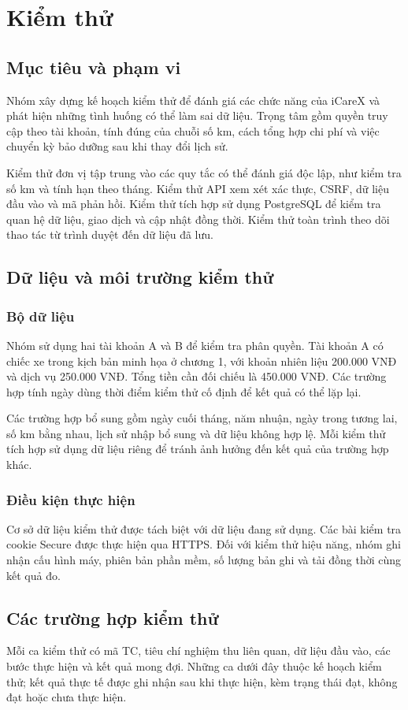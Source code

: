 \chapter{Kiểm thử}\label{chap:testing}
\section{Mục tiêu và phạm vi}
Nhóm xây dựng kế hoạch kiểm thử để đánh giá các chức năng của iCareX và phát hiện những tình huống có thể làm sai dữ liệu. Trọng tâm gồm quyền truy cập theo tài khoản, tính đúng của chuỗi số km, cách tổng hợp chi phí và việc chuyển kỳ bảo dưỡng sau khi thay đổi lịch sử.

Kiểm thử đơn vị tập trung vào các quy tắc có thể đánh giá độc lập, như kiểm tra số km và tính hạn theo tháng. Kiểm thử API xem xét xác thực, CSRF, dữ liệu đầu vào và mã phản hồi. Kiểm thử tích hợp sử dụng PostgreSQL để kiểm tra quan hệ dữ liệu, giao dịch và cập nhật đồng thời. Kiểm thử toàn trình theo dõi thao tác từ trình duyệt đến dữ liệu đã lưu.

\section{Dữ liệu và môi trường kiểm thử}
\subsection{Bộ dữ liệu}
Nhóm sử dụng hai tài khoản A và B để kiểm tra phân quyền. Tài khoản A có chiếc xe trong kịch bản minh họa ở chương 1, với khoản nhiên liệu 200.000 VNĐ và dịch vụ 250.000 VNĐ. Tổng tiền cần đối chiếu là 450.000 VNĐ. Các trường hợp tính ngày dùng thời điểm kiểm thử cố định để kết quả có thể lặp lại.

Các trường hợp bổ sung gồm ngày cuối tháng, năm nhuận, ngày trong tương lai, số km bằng nhau, lịch sử nhập bổ sung và dữ liệu không hợp lệ. Mỗi kiểm thử tích hợp sử dụng dữ liệu riêng để tránh ảnh hưởng đến kết quả của trường hợp khác.

\subsection{Điều kiện thực hiện}
Cơ sở dữ liệu kiểm thử được tách biệt với dữ liệu đang sử dụng. Các bài kiểm tra cookie Secure được thực hiện qua HTTPS. Đối với kiểm thử hiệu năng, nhóm ghi nhận cấu hình máy, phiên bản phần mềm, số lượng bản ghi và tải đồng thời cùng kết quả đo.

\section{Các trường hợp kiểm thử}
Mỗi ca kiểm thử có mã TC, tiêu chí nghiệm thu liên quan, dữ liệu đầu vào, các bước thực hiện và kết quả mong đợi. Những ca dưới đây thuộc kế hoạch kiểm thử; kết quả thực tế được ghi nhận sau khi thực hiện, kèm trạng thái đạt, không đạt hoặc chưa thực hiện.


